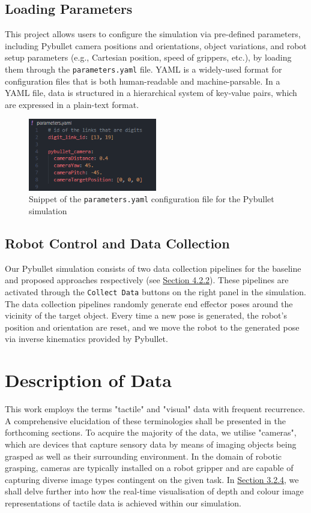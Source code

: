 \documentclass[11pt, a4paper]{report}
\begin{document}
\subsection{Loading Parameters}\label{sec:3.1.2}
This project allows users to configure the simulation via pre-defined parameters, including Pybullet camera positions and orientations, object variations, and robot setup parameters (e.g., Cartesian position, speed of grippers, etc.), by loading them through the \verb|parameters.yaml| file. YAML is a widely-used format for configuration files that is both human-readable and machine-parsable. In a YAML file, data is structured in a hierarchical system of key-value pairs, which are expressed in a plain-text format.
\begin{figure}[H]
    \centering
    \includegraphics[width=0.5\textwidth]{docs/Project Report/Media/3_1_2_yaml.png}
    \caption{Snippet of the {\verb|parameters.yaml|} configuration file for the Pybullet simulation}
    \label{fig:3.3}
\end{figure}


\subsection{Robot Control and Data Collection}\label{sec:3.1.3}
Our Pybullet simulation consists of two data collection pipelines for the baseline and proposed approaches respectively (see \hyperref[sec:4.2.2]{Section 4.2.2}). These pipelines are activated through the \verb|Collect Data| buttons on the right panel in the simulation. The data collection pipelines randomly generate end effector poses around the vicinity of the target object. Every time a new pose is generated, the robot's position and orientation are reset, and we move the robot to the generated pose via inverse kinematics provided by Pybullet.



\section{Description of Data}\label{sec:3.2}
This work employs the terms "tactile" and "visual" data with frequent recurrence. A comprehensive elucidation of these terminologies shall be presented in the forthcoming sections. To acquire the majority of the data, we utilise "cameras", which are devices that capture sensory data by means of imaging objects being grasped as well as their surrounding environment. In the domain of robotic grasping, cameras are typically installed on a robot gripper and are capable of capturing diverse image types contingent on the given task. In \hyperref[sec:3.2.4]{Section 3.2.4}, we shall delve further into how the real-time visualisation of depth and colour image representations of tactile data is achieved within our simulation.
\end{document}
